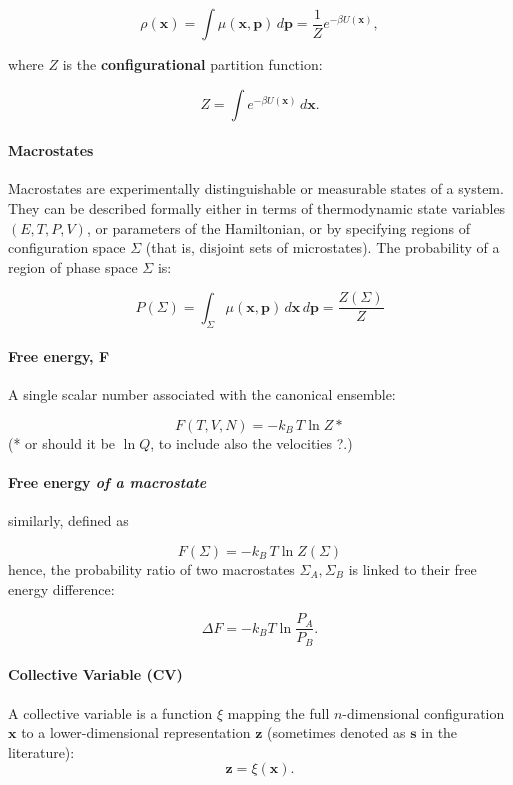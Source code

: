 $$
\rho(\mathbf{x}) = \int \mu(\mathbf{x}, \mathbf{p}) \, d\mathbf{p} = \frac{1}{Z} e^{-\beta U(\mathbf{x})},
$$

where $Z$ is the \textbf{configurational} partition function:

$$
Z = \int e^{-\beta U(\mathbf{x})} \, d\mathbf{x}.
$$


\paragraph{Macrostates}

Macrostates are experimentally distinguishable or measurable states of a system. They can be described formally either in terms of thermodynamic state variables $(E, T, P, V)$, or parameters of the Hamiltonian, or by specifying regions of configuration space $\Sigma$ (that is, disjoint sets of microstates).
The probability of a region of phase space $\Sigma$ is:

$$
P(\Sigma) = \int_{\Sigma} \mu(\mathbf{x}, \mathbf{p}) \, d\mathbf{x} \, d\mathbf{p} = \frac{Z(\Sigma)}{Z}
$$

\paragraph{Free energy, F}
A single scalar number associated with the canonical ensemble:

$$
F(T, V, N) = - k_B\,T \ln{Z}*
$$
(* or should it be $\ln{Q}$, to include also the velocities ?.)


\paragraph{Free energy \textit{of a macrostate}} similarly, defined as

$$
F(\Sigma) = - k_B\,T \ln{Z(\Sigma)}
$$
hence, the probability ratio of two macrostates $\Sigma_A, \Sigma_B$ is linked to their free energy difference:

$$
\Delta F = - k_B T \ln{\frac{P_A}{P_B}}.
$$

\paragraph{Collective Variable (CV)}

A collective variable is a function $\xi$ mapping the full $n$-dimensional configuration $\mathbf{x}$ to a lower-dimensional representation $\mathbf{z}$ (sometimes denoted as $\mathbf{s}$ in the literature):
$$
\mathbf{z} = \xi(\mathbf{x}).
$$
